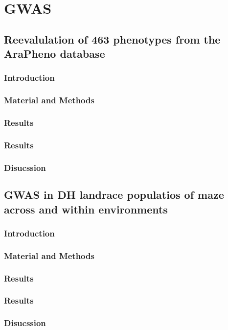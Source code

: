 
\chapter{GWAS}

\label{Chapter5} %


\section{Reevalulation of 463 phenotypes from the AraPheno database}

\subsection{Introduction}
\subsection{Material and Methods}
\subsection{Results}
\subsection{Results}
\subsection{Disucssion}



\section{GWAS in DH landrace populatios of maze across and within environments }

\subsection{Introduction}
\subsection{Material and Methods}
\subsection{Results}
\subsection{Results}
\subsection{Disucssion}

